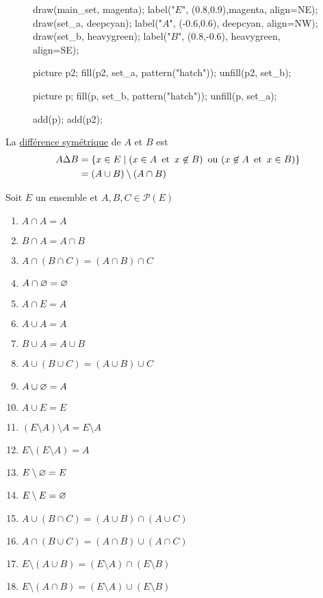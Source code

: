 \begin{defn}
\begin{enumerate}
\begin{minipage}
\begin{wrapfigure}{l}{3cm}
\begin{asy}
						draw(main_set, magenta); label("$E$", (0.8,0.9),magenta, align=NE);
						draw(set_a, deepcyan); label("$A$", (-0.6,0.6), deepcyan, align=NW);
						draw(set_b, heavygreen); label("$B$", (0.8,-0.6), heavygreen, align=SE);

						picture p2;
						fill(p2, set_a, pattern("hatch"));
						unfill(p2, set_b);

						picture p;
						fill(p, set_b, pattern("hatch"));
						unfill(p, set_a);

						add(p);
						add(p2);
					\end{asy}
				\end{wrapfigure}
				La \underline{différence symétrique} de $A$ et $B$ est
				\begin{align*}
					A \Delta B &= \left\{ x \in E  \mid (x \in A\operatorname{\text{ et }} x \not\in B)\operatorname{\text{ ou }}(x\not\in A\operatorname{\text{ et }} x \in B) \right\}\\
					&= (A\cup B)\setminus(A\cap B) \\
				\end{align*}
			\end{minipage}
	\end{enumerate}
\end{defn}

\begin{prop}
	Soit $E$ un ensemble et $A,B,C \in \mathcal{P}(E)$
	
	\begin{multicols}{2}
		\begin{enumerate}
			\item $A\cap A = A$
			\item $B \cap A = A\cap B$ 
			\item $A \cap (B\cap C) = (A\cap B)\cap C$ 
			\item $A \cap \varnothing = \varnothing$ 
			\item $A\cap E = A$ 
			\item $A \cup A = A$ 
			\item $B \cup A = A\cup B$ 
			\item $A \cup (B\cup C) = (A\cup B) \cup C$
			\item $A \cup \varnothing = A$ 
			\item $A\cup E = E$ 
			\item $(E\setminus A)\setminus A = E\setminus A$
			\item $E \setminus(E\setminus A) = A$
			\item $E\setminus\varnothing = E$ 
			\item $E\setminus E = \varnothing$ 
			\item $A \cup (B \cap C) = (A\cup B) \cap (A \cup C)$
			\item $A \cap (B \cup C) = (A\cap B) \cup (A \cap C)$
			\item $E \setminus (A\cup B) = (E\setminus A) \cap (E\setminus B)$
			\item $E \setminus (A \cap B) = (E\setminus A) \cup  (E\setminus B)$
		\end{enumerate}
	\end{multicols}
\end{prop}

